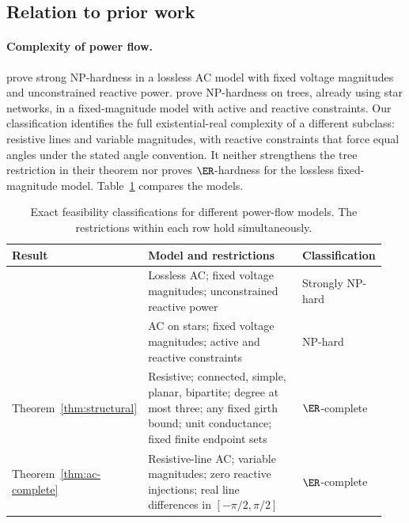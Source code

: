 \subsection{Relation to prior work}

\paragraph{Complexity of power flow.}
\citet{BienstockVerma2019} prove strong NP-hardness in a lossless AC model
with fixed voltage magnitudes and unconstrained reactive power.
\citet{LehmannEtAl2016} prove NP-hardness on trees, already using star
networks, in a fixed-magnitude model with active and reactive constraints.
Our classification identifies the full existential-real complexity of a
different subclass: resistive lines and variable magnitudes, with reactive
constraints that force equal angles under the stated angle convention.
It neither strengthens the tree restriction in their theorem nor proves
$\ER$-hardness for the lossless fixed-magnitude model.
Table~\ref{tab:prior-complexity} compares the models.

\begin{table}[t]
\centering
\small
\caption{Exact feasibility classifications for different power-flow models.
The restrictions within each row hold simultaneously.}
\label{tab:prior-complexity}
\begin{tabular}{@{}p{0.23\linewidth}p{0.49\linewidth}p{0.22\linewidth}@{}}
\toprule
Result & Model and restrictions & Classification \\
\midrule
\citet{BienstockVerma2019} & Lossless AC; fixed voltage magnitudes;
unconstrained reactive power & Strongly NP-hard \\
\addlinespace
\citet{LehmannEtAl2016} & AC on stars; fixed voltage magnitudes;
active and reactive constraints & NP-hard \\
\addlinespace
Theorem~\ref{thm:structural} & Resistive; connected, simple, planar,
bipartite; degree at most three; any fixed girth bound; unit conductance;
fixed finite endpoint sets & $\ER$-complete \\
\addlinespace
Theorem~\ref{thm:ac-complete} & Resistive-line AC; variable magnitudes;
zero reactive injections; real line differences in $[-\pi/2,\pi/2]$
& $\ER$-complete \\
\bottomrule
\end{tabular}
\end{table}

